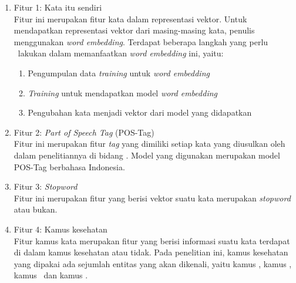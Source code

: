 	\begin{enumerate}
		\item Fitur 1: Kata itu sendiri\\
		Fitur ini merupakan fitur kata dalam representasi vektor. Untuk mendapatkan representasi vektor dari masing-masing kata, penulis menggunakan \textit{word embedding}. Terdapat beberapa langkah yang perlu \saya~lakukan dalam memanfaatkan \textit{word embedding} ini, yaitu:
		\begin{enumerate}
			\item Pengumpulan data \textit{training} untuk \textit{word embedding}
			\item \textit{Training} untuk mendapatkan model \textit{word embedding}
			\item Pengubahan kata menjadi vektor dari model yang didapatkan
		\end{enumerate}
		
		\item Fitur 2: \textit{Part of Speech Tag} (POS-Tag)\\
		Fitur ini merupakan fitur \textit{tag} yang dimiliki setiap kata yang diusulkan oleh \cite{abacha2011medical} dalam penelitiannya di bidang \mer. Model yang digunakan merupakan model POS-Tag berbahasa Indonesia.
		
		\item Fitur 3: \textit{Stopword}\\
		Fitur ini merupakan fitur yang berisi vektor suatu kata merupakan \textit{stopword} atau bukan.
		
		\item Fitur 4: Kamus kesehatan\\
		Fitur kamus kata merupakan fitur yang berisi informasi suatu kata terdapat di dalam kamus kesehatan atau tidak. Pada penelitian ini, kamus kesehatan yang dipakai ada sejumlah entitas yang akan dikenali, yaitu kamus \disease, kamus \symptom, kamus \drug~dan kamus \treatment.\
		

\end{enumerate}
